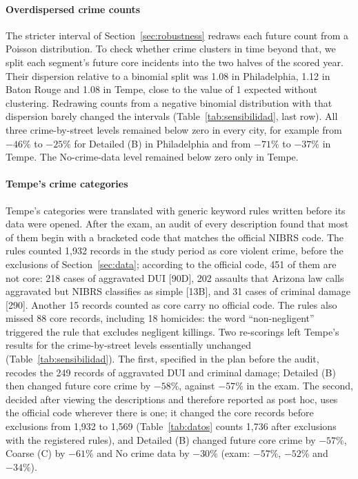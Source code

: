 \documentclass[preprint,12pt,authoryear]{elsarticle}
\begin{document}
\paragraph{Overdispersed crime counts} The stricter interval of Section~\ref{sec:robustness} redraws each future count from a Poisson distribution. To check whether crime clusters in time beyond that, we split each segment's future core incidents into the two halves of the scored year. Their dispersion relative to a binomial split was 1.08 in Philadelphia, 1.12 in Baton Rouge and 1.08 in Tempe, close to the value of 1 expected without clustering. Redrawing counts from a negative binomial distribution with that dispersion barely changed the intervals (Table~\ref{tab:sensibilidad}, last row). All three crime-by-street levels remained below zero in every city, for example from $-46\%$ to $-25\%$ for Detailed (B) in Philadelphia and from $-71\%$ to $-37\%$ in Tempe. The No-crime-data level remained below zero only in Tempe.

\paragraph{Tempe's crime categories} Tempe's categories were translated with generic keyword rules written before its data were opened. After the exam, an audit of every description found that most of them begin with a bracketed code that matches the official NIBRS code. The rules counted 1,932 records in the study period as core violent crime, before the exclusions of Section~\ref{sec:data}; according to the official code, 451 of them are not core: 218 cases of aggravated DUI [90D], 202 assaults that Arizona law calls aggravated but NIBRS classifies as simple [13B], and 31 cases of criminal damage [290]. Another 15 records counted as core carry no official code. The rules also missed 88 core records, including 18 homicides: the word ``non-negligent'' triggered the rule that excludes negligent killings. Two re-scorings left Tempe's results for the crime-by-street levels essentially unchanged (Table~\ref{tab:sensibilidad}). The first, specified in the plan before the audit, recodes the 249 records of aggravated DUI and criminal damage; Detailed (B) then changed future core crime by $-58\%$, against $-57\%$ in the exam. The second, decided after viewing the descriptions and therefore reported as post hoc, uses the official code wherever there is one; it changed the core records before exclusions from 1,932 to 1,569 (Table~\ref{tab:datos} counts 1,736 after exclusions with the registered rules), and Detailed (B) changed future core crime by $-57\%$, Coarse (C) by $-61\%$ and No crime data by $-30\%$ (exam: $-57\%$, $-52\%$ and $-34\%$).
\end{document}

